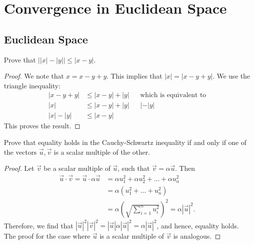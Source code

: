 \documentclass[12pt]{book}
\newenvironment{exercise}[2][Exercise]{\begin{trivlist}
\item[\hskip \labelsep {\bfseries #1}\hskip \labelsep {\bfseries #2.}]}{\end{trivlist}}
\begin{document}



\chapter{Convergence in Euclidean Space}
\section{Euclidean Space}


\begin{exercise}{7.1.5}
Prove that $\left| |x| - |y| \right| \leq \left| x- y \right|$.

    \begin{proof}
    We note that $x = x-y+y$. This implies that $\left|x\right| = \left| x - y + y\right| $. We use the triangle inequality:\
        \begin{align*}
        \left| x - y + y \right| &\leq \left|x-y\right| + |y| &&\text{which is equivalent to}\\
        \left| x \right| &\leq \left|x-y\right| + |y| &&| - |y| \\
        \left| x \right| - \left| y \right| &\leq \left| x- y \right|
        \end{align*}
    This proves the result.
    \end{proof}
\end{exercise}


\begin{exercise}{7.1.6}
Prove that equality holds in the Cauchy-Schwartz inequality if and only if one of the vectors $\vec{u}, \vec{v}$ is a scalar multiple of the other.

    \begin{proof}
    Let $\vec{v}$ be a scalar multiple of $\vec{u}$, such that $\vec{v} = \alpha \vec{u}$. Then
        \begin{align*}
        \vec{u} \cdot \vec{v} = \vec{u} \cdot \alpha \vec{u} &= \alpha u_1^2 + \alpha u_2^2 + \hdots + \alpha u_n^2 \\
         &= \alpha \left( u_1^2 + \hdots + u_n^2 \right) \\
         &= \alpha \left( \sqrt{ \sum_{i=1}^n u_i^2 } \right)^2 = \alpha \left| \vec{u} \right| ^2.
        \end{align*}
    Therefore, we find that $\left| \vec{u} \right|^2 \left|\vec{v}\right|^2 = \left|\vec{u}\right| \alpha \left|\vec{u}\right|^2= \alpha \left| \vec{u} \right|^2$, and hence, equality holds. The proof for the case where $\vec{u}$ is a scalar multiple of $\vec{v}$ is analogous.
    \end{proof}
\end{exercise}
\end{document}
